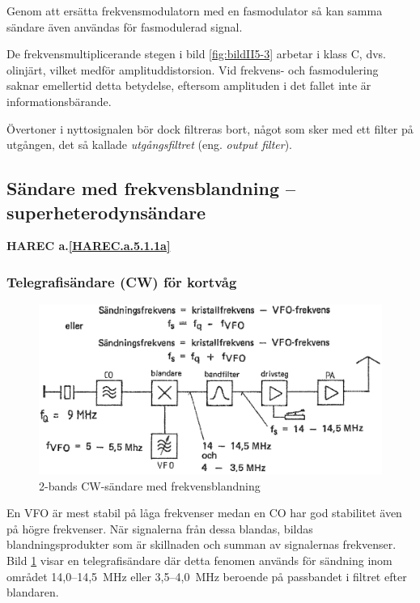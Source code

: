 Genom att ersätta frekvensmodulatorn med en fasmodulator så kan samma
sändare även användas för fasmodulerad signal.

De frekvensmultiplicerande stegen i bild \ref{fig:bildII5-3} arbetar i klass C,
dvs. olinjärt, vilket medför amplituddistorsion.
Vid frekvens- och fasmodulering saknar emellertid detta betydelse, eftersom
amplituden i det fallet inte är informationsbärande.

Övertoner i nyttosignalen bör dock filtreras bort, något som sker med ett
filter på utgången, det så kallade \emph{utgångsfiltret}
(eng. \emph{output filter}).

\subsection{Sändare med frekvensblandning -- superheterodynsändare}
\textbf{HAREC a.\ref{HAREC.a.5.1.1a}\label{myHAREC.a.5.1.1a}}

\subsubsection{Telegrafisändare (CW) för kortvåg}

\begin{figure}
  \includegraphics[width=\textwidth]{images/cropped_pdfs/bild_2_5-04.pdf}
  \caption{2-bands CW-sändare med frekvensblandning}
  \label{fig:bildII5-4}
\end{figure}

En VFO är mest stabil på låga frekvenser medan en CO har god
stabilitet även på högre frekvenser.
När signalerna från dessa blandas, bildas blandningsprodukter som är
skillnaden och summan av signalernas frekvenser.
Bild \ref{fig:bildII5-4} visar en telegrafisändare där detta fenomen används
för sändning inom området 14,0--14,5~MHz eller 3,5--4,0~MHz beroende
på passbandet i filtret efter blandaren.


